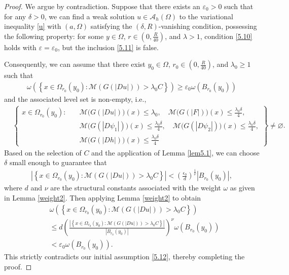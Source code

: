 \documentclass[10pt,a4paper]{article}
\theoremstyle{definition}
\numberwithin{equation}{section}
\begin{document}
 
 \begin{proof}
 	We argue by contradiction. Suppose that there exists an $\varepsilon_0 > 0$ such that for any $\delta > 0$, we can find a weak solution $u \in \mathcal{A}_h(\Omega)$ to the variational inequality \eqref{u} with $(a, \Omega)$ satisfying the $(\delta, R)$-vanishing condition, possessing the following property: for some $y \in \Omega$, $r \in (0, \frac{R}{40})$, and $\lambda > 1$, condition \eqref{5.10} holds with $\varepsilon = \varepsilon_0$, but the inclusion \eqref{5.11} is false.
 	
 	
 	
 Consequently, we can assume that there exist $y_0 \in \Omega$, $r_0 \in (0, \frac{R}{40})$, and $\lambda_0 \geq 1$ such that
 	\begin{align}\label{5.12}
 		\omega
 		\left(
 		\left\{
 		x\in\Omega_{r_0}(y_0):
 		\mathcal{M}(G(|Du|))>\lambda_0C
 		\right\}
 		\right)
 		\geq
 		\varepsilon_0\omega(B_{r_0}(y_0))
 	\end{align}
 and the associated level set is non-empty, i.e.,
 \begin{align*}
 	&\left\{
 	\begin{aligned}
 		x\in\Omega_{r_0}(y_0):\quad
 		&\mathcal{M}\bigl(G(|Du|)\bigr)(x)\leq\lambda_0,\quad
 		\mathcal{M}\bigl(G(|F|)\bigr)(x)
 		\leq\frac{\lambda_0\delta}{4},
 		\\
 		&\mathcal{M}\bigl(G(|D\psi_1|)\bigr)(x)
 		\leq\frac{\lambda_0\delta}{4},\quad
 		\mathcal{M}\bigl(G(|D\psi_2|)\bigr)(x)
 		\leq\frac{\lambda_0\delta}{4},
 		\\
 		&\mathcal{M}\bigl(G(|Dh|)\bigr)(x)
 		\leq\frac{\lambda_0\delta}{4}
 	\end{aligned}
 	\right\}
 	\neq\varnothing .
 \end{align*}
 Based on the selection of $C$ and the application of Lemma \ref{lem5.1}, we can choose $\delta$ small enough to guarantee that
 	\begin{align*}
 		\left|
 		\left\{
 		x\in\Omega_{r_0}(y_0):
 		\mathcal{M}(G(|Du|))>\lambda_0C
 		\right\}
 		\right|
 		<
 		\left(\frac{\epsilon_0}{d}\right)^{\frac1\nu}
 		|B_{r_0}(y_0)|,
 	\end{align*}
 	where $d$ and $\nu$ are the structural constants associated with the weight $\omega$ as given in Lemma \ref{weight2}.
 	Then applying Lemma \ref{weight2} to obtain
 	\begin{align*}
 		&\omega
 		\left(
 		\left\{
 		x\in\Omega_{r_0}(y_0):
 		\mathcal{M}(G(|Du|))>\lambda_0C
 		\right\}
 		\right)
 		\nonumber\\
 		&\leq
 		d
 		\left(
 		\frac{
 			\left|
 			\left\{
 			x\in\Omega_{r_0}(y_0):
 			\mathcal{M}(G(|Du|))>\lambda_0C
 			\right\}
 			\right|
 		}
 		{|B_{r_0}(y_0)|}
 		\right)^\nu
 		\omega(B_{r_0}(y_0))
 		\nonumber\\
 		&<
 		\varepsilon_0\omega(B_{r_0}(y_0)).
 	\end{align*}
 This strictly contradicts our initial assumption \eqref{5.12}, thereby completing the proof.
 \end{proof}
 
\end{document}
